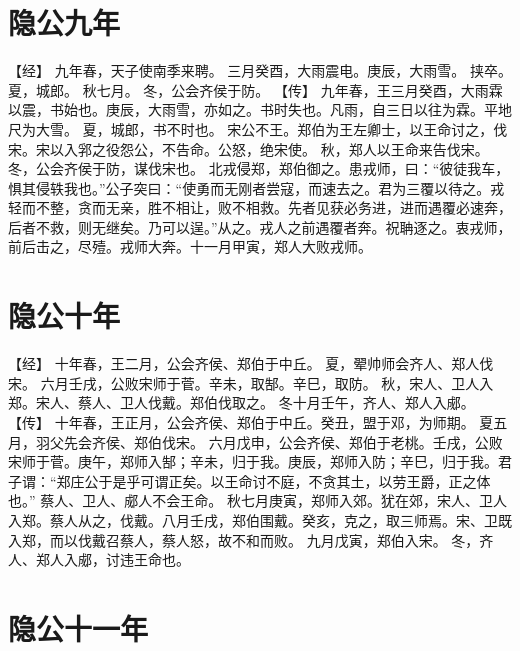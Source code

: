 \documentclass[a4paper,12pt,UTF8,twoside]{ctexbook}
\begin{document}
\chapter{隐公九年}

【经】
九年春，天子使南季来聘。
三月癸酉，大雨震电。庚辰，大雨雪。
挟卒。
夏，城郎。
秋七月。
冬，公会齐侯于防。
【传】
九年春，王三月癸酉，大雨霖以震，书始也。庚辰，大雨雪，亦如之。书时失也。凡雨，自三日以往为霖。平地尺为大雪。
夏，城郎，书不时也。
宋公不王。郑伯为王左卿士，以王命讨之，伐宋。宋以入郛之役怨公，不告命。公怒，绝宋使。
秋，郑人以王命来告伐宋。
冬，公会齐侯于防，谋伐宋也。
北戎侵郑，郑伯御之。患戎师，曰：“彼徒我车，惧其侵轶我也。”公子突曰：“使勇而无刚者尝寇，而速去之。君为三覆以待之。戎轻而不整，贪而无亲，胜不相让，败不相救。先者见获必务进，进而遇覆必速奔，后者不救，则无继矣。乃可以逞。”从之。戎人之前遇覆者奔。祝聃逐之。衷戎师，前后击之，尽殪。戎师大奔。十一月甲寅，郑人大败戎师。

\chapter{隐公十年}

【经】
十年春，王二月，公会齐侯、郑伯于中丘。
夏，翚帅师会齐人、郑人伐宋。
六月壬戌，公败宋师于菅。辛未，取郜。辛巳，取防。
秋，宋人、卫人入郑。宋人、蔡人、卫人伐戴。郑伯伐取之。
冬十月壬午，齐人、郑人入郕。
【传】
十年春，王正月，公会齐侯、郑伯于中丘。癸丑，盟于邓，为师期。
夏五月，羽父先会齐侯、郑伯伐宋。
六月戊申，公会齐侯、郑伯于老桃。壬戌，公败宋师于菅。庚午，郑师入郜；辛未，归于我。庚辰，郑师入防；辛巳，归于我。君子谓：“郑庄公于是乎可谓正矣。以王命讨不庭，不贪其土，以劳王爵，正之体也。”
蔡人、卫人、郕人不会王命。
秋七月庚寅，郑师入郊。犹在郊，宋人、卫人入郑。蔡人从之，伐戴。八月壬戌，郑伯围戴。癸亥，克之，取三师焉。宋、卫既入郑，而以伐戴召蔡人，蔡人怒，故不和而败。
九月戊寅，郑伯入宋。
冬，齐人、郑人入郕，讨违王命也。

\chapter{隐公十一年}
\end{document}
